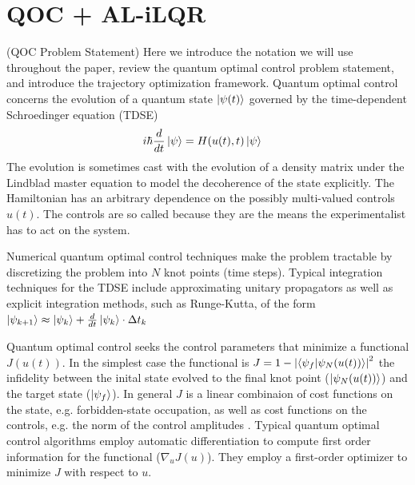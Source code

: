\documentclass[
  amsfonts,
  amsmath,
  tbtags,
  amssymb,
  aps,
  nobibnotes,
  twocolumn,
  superscriptaddress,
]{revtex4-2}
\begin{document}
\section{QOC + AL-iLQR}
(QOC Problem Statement) Here we introduce the notation
we will use throughout the paper,
review the quantum optimal control problem statement,
and introduce the trajectory optimization framework.
Quantum optimal control concerns the evolution of
a quantum state $\ket{\psi(t)}$ governed by the time-dependent
Schroedinger equation (TDSE)
\label{eq:tdse}
\begin{align}
  i \hbar \frac{d}{dt} \ket{\psi} &= H(u(t), t) \ket{\psi}
\end{align}
The evolution is sometimes cast with the evolution
of a density matrix under the Lindblad master equation to
model the decoherence of the state explicitly. The Hamiltonian
has an arbitrary dependence on the possibly multi-valued controls $u(t)$.
The controls are so called because they are the means the experimentalist has to
act on the system.

Numerical quantum optimal control techniques make
the problem tractable by discretizing the problem into $N$
knot points (time steps). Typical integration techniques for the TDSE include
approximating unitary propagators as well as explicit integration methods,
such as Runge-Kutta, of the form
$\ket{\psi_{k + 1}} \approx \ket{\psi_{k}} + \frac{d}{dt} \ket{\psi_{k}} \cdot \Delta t_{k}$

Quantum optimal control seeks the control
parameters that minimize a functional $J(u(t))$.
In the simplest case the functional is
$J = 1 - {\lvert \braket{\psi_{f} \lvert \psi_{N}(u(t))} \rvert}^{2}$
the infidelity between the inital state evolved
to the final knot point ($\ket{\psi_{N}(u(t))}$)
and the target state ($\ket{\psi_{f}}$). In general
$J$ is a linear combinaion of cost functions on the state, e.g.
forbidden-state occupation, as well as
cost functions on the controls, e.g. the norm of the control amplitudes
\cite{leung2017speedup}. Typical quantum optimal control
algorithms employ automatic differentiation
to compute first order information for the functional ($\nabla_{u} J(u)$).
They employ a first-order optimizer to minimize $J$ with respect to $u$.
\end{document}
